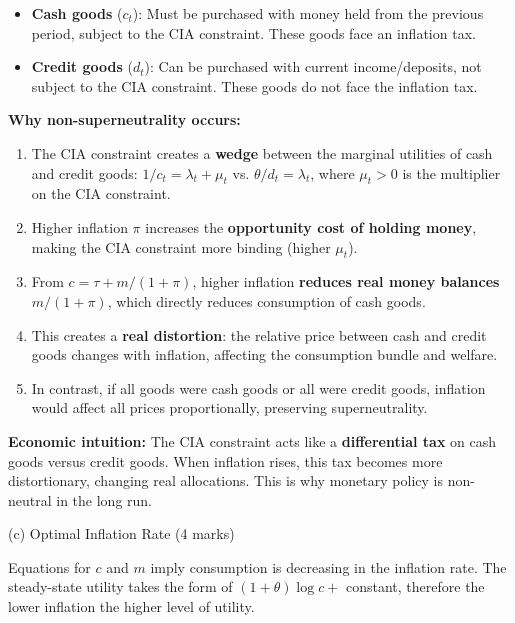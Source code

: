 \begin{itemize}
    \item \textbf{Cash goods} ($c_t$): Must be purchased with money held from the previous period, subject to the CIA constraint. These goods face an inflation tax.
    
    \item \textbf{Credit goods} ($d_t$): Can be purchased with current income/deposits, not subject to the CIA constraint. These goods do not face the inflation tax.
\end{itemize}

\textbf{Why non-superneutrality occurs:}

\begin{enumerate}
    \item The CIA constraint creates a \textbf{wedge} between the marginal utilities of cash and credit goods: $1/c_t = \lambda_t + \mu_t$ vs. $\theta/d_t = \lambda_t$, where $\mu_t > 0$ is the multiplier on the CIA constraint.
    
    \item Higher inflation $\pi$ increases the \textbf{opportunity cost of holding money}, making the CIA constraint more binding (higher $\mu_t$).
    
    \item From $c = \tau + m/(1+\pi)$, higher inflation \textbf{reduces real money balances} $m/(1+\pi)$, which directly reduces consumption of cash goods.
    
    \item This creates a \textbf{real distortion}: the relative price between cash and credit goods changes with inflation, affecting the consumption bundle and welfare.
    
    \item In contrast, if all goods were cash goods or all were credit goods, inflation would affect all prices proportionally, preserving superneutrality.
\end{enumerate}

\textbf{Economic intuition:} The CIA constraint acts like a \textbf{differential tax} on cash goods versus credit goods. When inflation rises, this tax becomes more distortionary, changing real allocations. This is why monetary policy is non-neutral in the long run.

(c) Optimal Inflation Rate (4 marks)

Equations for $c$ and $m$ imply consumption is decreasing in the inflation rate. The steady-state utility takes the form of $(1+\theta)\log c +$ constant, therefore the lower inflation the higher level of utility. 

